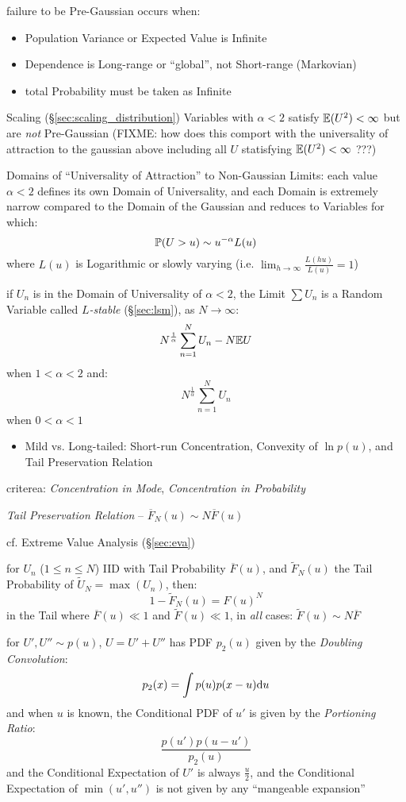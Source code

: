 failure to be Pre-Gaussian occurs when:
\begin{itemize}
  \item Population Variance or Expected Value is Infinite
  \item Dependence is Long-range or ``global'', not Short-range (Markovian)
  \item total Probability must be taken as Infinite
\end{itemize}

Scaling (\S\ref{sec:scaling_distribution}) Variables with $\alpha < 2$ satisfy
$\mathbb{E}(U^2) < \infty$ but are \emph{not} Pre-Gaussian
(FIXME: how does this comport with the universality of attraction to the
gaussian above including all $U$ statisfying $\mathbb{E}(U^2) < \infty$ ???)

Domains of ``Universality of Attraction'' to Non-Gaussian Limits: each value
$\alpha < 2$ defines its own Domain of Universality, and each Domain is
extremely narrow compared to the Domain of the Gaussian and reduces to Variables
for which:
\[
  \mathbb{P}(U > u) \sim u^{-\alpha} L(u)
\]
where $L(u)$ is Logarithmic or slowly varying (i.e.
$\lim_{h \to \infty} \frac{L(hu)}{L(u)} = 1$)

if $U_n$ is in the Domain of Universality of $\alpha < 2$, the Limit $\sum U_n$
is a Random Variable called \emph{$L$-stable} (\S\ref{sec:lsm}), as
$N \to \infty$:
\[
  N^\frac{1}{\alpha} \sum_{n=1}^N U_n - N \mathbb{E}{U}
\]
when $1 < \alpha < 2$ and:
\[
  N^\frac{1}{\alpha} \sum_{n=1}^N U_n
\]
when $0 < \alpha < 1$

\begin{itemize}
  \item Mild vs. Long-tailed: Short-run Concentration, Convexity of $\ln p(u)$,
    and Tail Preservation Relation
\end{itemize}

criterea: \emph{Concentration in Mode}, \emph{Concentration in Probability}

\emph{Tail Preservation Relation} -- $\overline{F}_N(u) \sim N \overline{F}(u)$

cf. Extreme Value Analysis (\S\ref{sec:eva})

for $U_n$ ($1 \leq n \leq N$) IID with Tail Probability $\overline{F}(u)$, and
$\tilde{F}_N(u)$ the Tail Probability of $\tilde{U}_N = \max(U_n)$, then:
\[
  1 - \tilde{F}_N(u) = F(u)^N
\]
in the Tail where $\overline{F}(u) \ll 1$ and $\tilde{F}(u) \ll 1$, in
\emph{all} cases: $\tilde{F}(u) \sim N \overline{F}$

for $U', U'' \sim p(u)$, $U = U' + U''$ has PDF $p_2(u)$ given by the
\emph{Doubling Convolution}:
\[
  p_2(x) = \int p(u) p(x - u) \mathrm{d}u
\]
and when $u$ is known, the Conditional PDF of $u'$ is given by the
\emph{Portioning Ratio}:
\[
  \frac{p(u') p(u - u')}{p_2(u)}
\]
and the Conditional Expectation of $U'$ is always $\frac{u}{2}$, and the
Conditional Expectation of $\min(u', u'')$ is not given by any ``mangeable
expansion''

